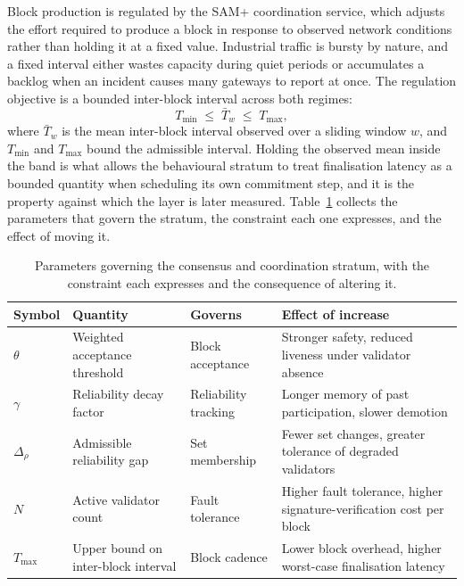 Block production is regulated by the SAM+ coordination service, which adjusts the effort required to produce a block in response to observed network conditions rather than holding it at a fixed value. Industrial traffic is bursty by nature, and a fixed interval either wastes capacity during quiet periods or accumulates a backlog when an incident causes many gateways to report at once. The regulation objective is a bounded inter-block interval across both regimes:
\begin{equation}
\label{eq:sam-band}
T_{\min} \;\leq\; \bar{T}_{w} \;\leq\; T_{\max} ,
\end{equation}
where $\bar{T}_{w}$ is the mean inter-block interval observed over a sliding window $w$, and $T_{\min}$ and $T_{\max}$ bound the admissible interval. Holding the observed mean inside the band is what allows the behavioural stratum to treat finalisation latency as a bounded quantity when scheduling its own commitment step, and it is the property against which the layer is later measured. Table~\ref{tab:consensus-params} collects the parameters that govern the stratum, the constraint each one expresses, and the effect of moving it.

\begin{table}[!htbp]
  \centering
  \footnotesize
  \setlength{\tabcolsep}{5pt}
  \renewcommand{\arraystretch}{1.3}
  \caption{Parameters governing the consensus and coordination stratum, with the constraint each expresses and the consequence of altering it.}
  \label{tab:consensus-params}
  \begin{tabularx}{\textwidth}{@{}
      >{\raggedright\arraybackslash}p{1.6cm}
      >{\raggedright\arraybackslash}p{4.0cm}
      >{\raggedright\arraybackslash}p{2.6cm}
      >{\raggedright\arraybackslash}X@{}}
    \toprule
    \textbf{Symbol} & \textbf{Quantity} & \textbf{Governs} & \textbf{Effect of increase} \\
    \midrule
    $\theta$
      & Weighted acceptance threshold
      & Block acceptance
      & Stronger safety, reduced liveness under validator absence \\
    $\gamma$
      & Reliability decay factor
      & Reliability tracking
      & Longer memory of past participation, slower demotion \\
    $\Delta_\rho$
      & Admissible reliability gap
      & Set membership
      & Fewer set changes, greater tolerance of degraded validators \\
    $N$
      & Active validator count
      & Fault tolerance
      & Higher fault tolerance, higher signature-verification cost per block \\
    $T_{\max}$
      & Upper bound on inter-block interval
      & Block cadence
      & Lower block overhead, higher worst-case finalisation latency \\
    \bottomrule
  \end{tabularx}
\end{table}

